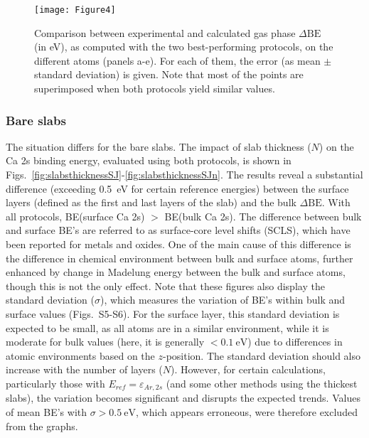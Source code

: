 \documentclass[journal=jpccck,manuscript=article]{achemso}
\def\dbe{\ensuremath{\Delta\text{BE}}}
\begin{document}
\begin{figure}[p]
	\centering
	\texttt{[image: Figure4]}
	\caption{Comparison between experimental and calculated gas phase \dbe{} (in \si{\electronvolt}), as computed with the two best-performing protocols, on the different atoms (panels a-e). For each of them, the error (as mean $\pm$ standard deviation) is given. Note that most of the points are superimposed when both protocols yield similar values.}
	\label{fig:xps_C185}
\end{figure}

\clearpage

\subsubsection{Bare slabs}

The situation differs for the bare slabs. The impact of slab thickness ($N$) on the Ca 2s binding energy, evaluated using both protocols, is shown in Figs.~\ref{fig:slabsthicknessSJ}-\ref{fig:slabsthicknessSJn}. The results reveal a substantial difference (exceeding \SI{0.5}{\electronvolt} for certain reference energies) between the surface layers (defined as the first and last layers of the slab) and the bulk \dbe{}. With all protocols, BE(surface Ca 2s) $>$ BE(bulk Ca 2s). The difference between bulk and surface BE's are referred to as surface-core level shifts (SCLS),\cite{olovssonCorelevelShiftsComplex2006,bagusChemicalSignificanceXray2023} which have been reported for metals\cite{aldenInitioSurfaceCorelevel1993,weinertCorelevelShiftsBulk1995,olovssonCorelevelShiftsComplex2006} and oxides\cite{harmerSpeciesFormedCuprite2009,calatayudExploringMetalOxides2011,lousadaFirstStagesOxide2018,bagusRevisitingSurfaceCorelevel2019,cristinadeoliveiraRoleSurfacesMagnetic2021,silvalucenademedeirosAMoO3MicroNanoparticles2024}. One of the main cause of this difference is the difference in chemical environment between bulk and surface atoms, further enhanced by change in Madelung energy between the bulk and surface atoms\cite{nelinSurfaceCorelevelBinding2014}, though this is not the only effect\cite{bagusRevisitingSurfaceCorelevel2019,bagusChemicalSignificanceXray2023,bagusXrayPhotoelectronSpectroscopy2024}. 
Note that these figures also display the standard deviation ($\sigma$), which measures the variation of BE's within bulk and surface values (Figs.~S5-S6). For the surface layer, this standard deviation is expected to be small, as all atoms are in a similar environment, while it is moderate for bulk values (here, it is generally $<\SI{0.1}{\electronvolt}$) due to differences in atomic environments based on the $z$-position. The standard deviation should also increase with the number of layers ($N$). However, for certain calculations, particularly those with $E_{ref}=\varepsilon_{Ar,2s}$ (and some other methods using the thickest slabs), the variation becomes significant and disrupts the expected trends. Values of mean BE's with $\sigma > \SI{0.5}{\electronvolt}$, which appears erroneous, were therefore excluded from the graphs.
\end{document}
